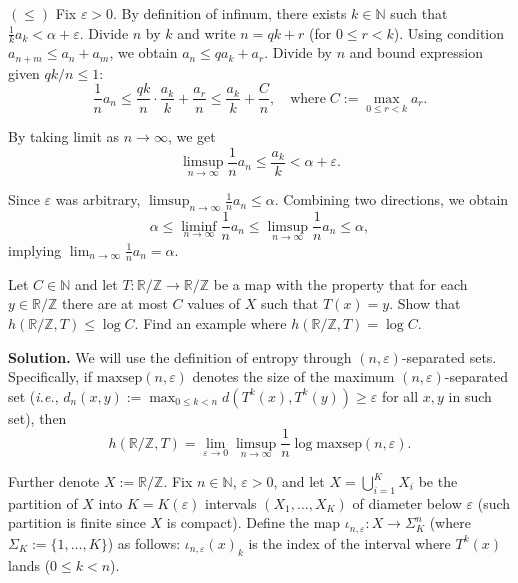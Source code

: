 \documentclass{template}
\begin{document}
$(\leq)$ Fix $\varepsilon>0$. By definition of infinum, there exists $k \in
\mathbb{N}$ such that $\frac{1}{k}a_k < \alpha+\varepsilon$. Divide $n$ by $k$
and write $n=qk+r$ (for $0 \leq r < k$). Using condition $a_{n+m} \leq a_n + a_m$,
we obtain $a_n \leq qa_k + a_r$. Divide by $n$ and bound expression given $qk/n \leq 1$:
\begin{equation*}
    \frac{1}{n}a_n \leq \frac{qk}{n} \cdot \frac{a_k}{k} + \frac{a_r}{n} \leq \frac{a_k}{k} + \frac{C}{n}, \quad \text{where} \; C := \max_{0 \leq r < k}a_r.
\end{equation*}

By taking limit as $n \to \infty$, we get 
\begin{equation*}
    \limsup_{n \to \infty} \frac{1}{n}a_n \leq \frac{a_k}{k} < \alpha + \varepsilon.
\end{equation*}

Since $\varepsilon$ was arbitrary, $\limsup_{n \to \infty} \frac{1}{n}a_n \leq \alpha$. 
Combining two directions, we obtain
\begin{equation*}
    \alpha \leq \liminf_{n \to \infty} \frac{1}{n}a_n \leq \limsup_{n \to \infty} \frac{1}{n}a_n \leq \alpha,
\end{equation*}
implying $\lim_{n \to \infty}\frac{1}{n}a_n = \alpha$.

\begin{problem}[Exercise 5]
    Let $C \in \mathbb{N}$ and let $T: \mathbb{R}/\mathbb{Z} \to
    \mathbb{R}/\mathbb{Z}$ be a map with the property that for each $y \in
    \mathbb{R}/\mathbb{Z}$ there are at most $C$ values of $X$ such that
    $T(x)=y$. Show that $h(\mathbb{R}/\mathbb{Z},T) \leq \log C$. Find an
    example where $h(\mathbb{R}/\mathbb{Z},T) = \log C$.
\end{problem}

\textbf{Solution.} We will use the definition of entropy through
$(n,\varepsilon)$-separated sets. Specifically, if
$\text{maxsep}(n,\varepsilon)$ denotes the size of the maximum
$(n,\varepsilon)$-separated set (\textit{i.e.}, $d_n(x,y) := \max_{0 \leq k < n} d(T^k(x), T^k(y)) \geq \varepsilon$ for
all $x,y$ in such set), then
\begin{equation*}
    h(\mathbb{R}/\mathbb{Z},T) = \lim_{\varepsilon \to 0}\limsup_{n \to \infty} \frac{1}{n} \log\text{maxsep}(n,\varepsilon).
\end{equation*}

Further denote $X := \mathbb{R}/\mathbb{Z}$. Fix $n \in \mathbb{N}$, $\varepsilon>0$, and let
$X=\bigcup_{i=1}^{K} X_i$ be the partition of $X$ into $K=K(\varepsilon)$ intervals
$(X_1,\dots,X_K)$ of diameter below $\varepsilon$ (such partition is finite
since $X$ is compact). Define the map $\iota_{n,\varepsilon}: X \to
\Sigma_K^n$ (where $\Sigma_K := \{1,\dots,K\}$) as follows: $\iota_{n,\varepsilon}(x)_k$ is the index of the interval
where $T^k(x)$ lands ($0 \leq k < n$). 
\end{document}
